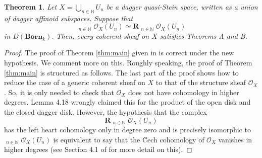 \documentclass[11pt,leqno,a4paper]{amsart}
\newtheorem{theorem}{Theorem}
\theoremstyle{remark}
\theoremstyle{definition}
\numberwithin{equation}{theorem}
\def\N{{\mathbb N}}
\def\cO{{\mathcal O}}
\def\limpro{\mathop{\lim\limits_{\displaystyle\leftarrow}}}
\def\bBorn{\mathbf{Born}}
\begin{document}
\begin{theorem} \label{thm:main_correct}
Let $X = \bigcup_{n \in \N} U_n$ be a dagger quasi-Stein space, written as a union of dagger affinoid subspaces. Suppose that
\[ \limpro_{n \in \N} \cO_X(U_n) \simeq \mathbf{R}\! \limpro_{n \in \N} \cO_X(U_n) \]
in $D(\bBorn_k)$. Then, every coherent sheaf on $X$ satisfies Theorems A and B.
\end{theorem}
\begin{proof}
The proof of Theorem \ref{thm:main} given in \cite{Bam} is correct under the new hypothesis. We comment more on this. Roughly speaking, the proof of Theorem \ref{thm:main} is structured as follows. The last part of the proof shows how to reduce the case of a generic coherent sheaf on $X$ to that of the structure sheaf $\cO_X$. So, it is only needed to check that $\cO_X$ does not have cohomology in higher degrees. Lemma 4.18 wrongly claimed this for the product of the open disk and the closed dagger disk. However, the hypothesis that the complex
\[ \mathbf{R}\! \limpro_{n \in \N} \cO_X(U_n) \]
has the left heart cohomology only in degree zero and is precisely isomorphic to $\limpro_{n \in \N} \cO_X(U_n)$ is equivalent to say that the \u{C}ech cohomology of $\cO_X$ vanishes in higher degrees (see Section 4.1 of \cite{Bam} for more detail on this).
\end{proof}
\end{document}
